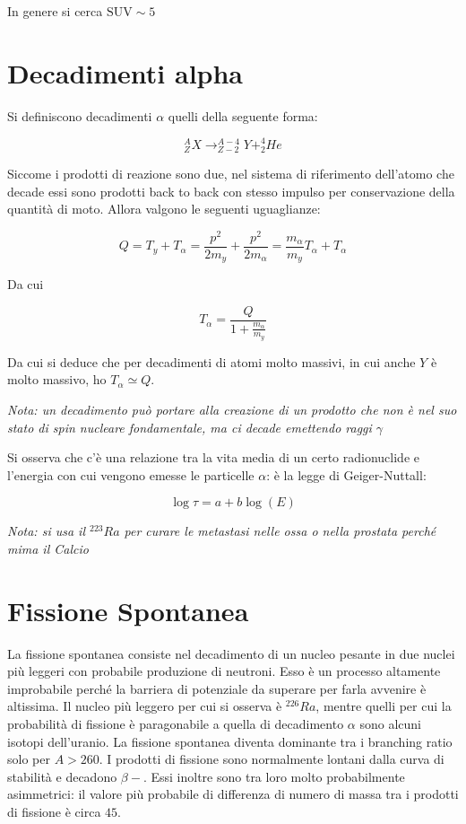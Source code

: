 In genere si cerca $\text{SUV}\sim5$

\section{Decadimenti alpha}

Si definiscono decadimenti $\alpha$ quelli della seguente forma:

\begin{equation}
^A_Z X \longrightarrow ^{A-4}_{Z-2}Y + ^4_2He
\end{equation}

Siccome i prodotti di reazione sono due, nel sistema di riferimento dell'atomo che decade essi sono prodotti back to back con stesso impulso per conservazione della quantità di moto. Allora valgono le seguenti uguaglianze:

\begin{equation}
Q=T_y+T_{\alpha}=\frac{p^2}{2m_y}+\frac{p^2}{2m_{\alpha}}=\frac{m_{\alpha}}{m_y}T_{\alpha}+T_{\alpha}
\end{equation}

Da cui

\begin{equation}
T_{\alpha}=\frac{Q}{1+\frac{m_{\alpha}}{m_y}} 
\end{equation}

Da cui si deduce che per decadimenti di atomi molto massivi, in cui anche $Y$ è molto massivo, ho $T_{\alpha}\simeq Q$.

\emph{Nota: un decadimento può portare alla creazione di un prodotto che non è nel suo stato di spin nucleare fondamentale, ma ci decade emettendo raggi $\gamma$ }

Si osserva che c'è una relazione tra la vita media di un certo radionuclide e l'energia con cui vengono emesse le particelle $\alpha$: è la legge di Geiger-Nuttall:

\begin{equation}
\log \tau = a + b \log (E)
\end{equation}

\emph{Nota: si usa il $^{223}Ra$ per curare le metastasi nelle ossa o nella prostata perché mima il Calcio}

\section{Fissione Spontanea}

La fissione spontanea consiste nel decadimento di un nucleo pesante in due nuclei più leggeri con probabile produzione di neutroni. Esso è un processo altamente improbabile perché la barriera di potenziale da superare per farla avvenire è altissima. Il nucleo più leggero per cui si osserva è $^{226}Ra$, mentre quelli per cui la probabilità di fissione è paragonabile a quella di decadimento $\alpha$ sono alcuni isotopi dell'uranio. La fissione spontanea diventa dominante tra i branching ratio solo per $A>260$.
I prodotti di fissione sono normalmente lontani dalla curva di stabilità e decadono $\beta-$. 
Essi inoltre sono tra loro molto probabilmente asimmetrici: il valore più probabile di differenza di numero di massa tra i prodotti di fissione è circa $45$.

